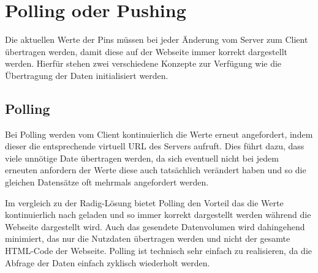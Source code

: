 
\section{Polling oder Pushing}
Die aktuellen Werte der Pins müssen bei jeder Änderung vom Server zum Client übertragen 
werden, damit diese auf der Webseite immer korrekt dargestellt werden. Hierfür stehen zwei 
verschiedene Konzepte zur Verfügung wie die Übertragung der Daten initialisiert werden.

\subsection{Polling}
Bei Polling werden vom Client kontinuierlich die Werte erneut angefordert, indem dieser 
die entsprechende virtuell URL des Servers aufruft. Dies führt dazu, dass viele unnötige 
Date übertragen werden, da sich eventuell nicht bei jedem erneuten anfordern der Werte 
diese auch tatsächlich verändert haben und so die gleichen Datensätze oft mehrmals 
angefordert werden.

Im vergleich zu der Radig-Lösung bietet Polling den Vorteil das die Werte kontinuierlich 
nach geladen und so immer korrekt dargestellt werden während die Webseite dargestellt 
wird. Auch das gesendete Datenvolumen wird dahingehend minimiert, das nur die Nutzdaten 
übertragen werden und nicht der gesamte HTML-Code der Webseite. Polling ist technisch sehr 
einfach zu realisieren, da die Abfrage der Daten einfach zyklisch wiederholt werden.

